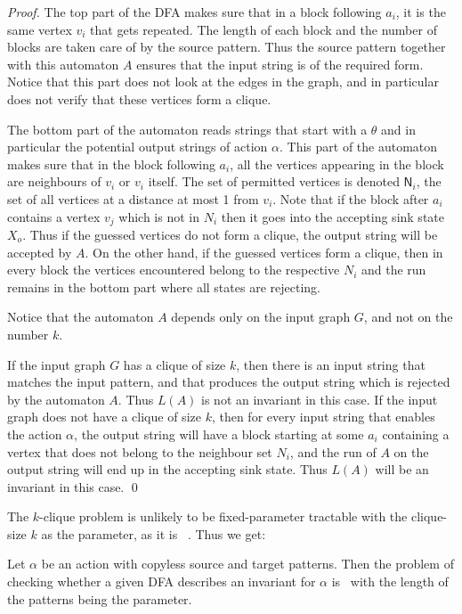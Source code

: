 \documentclass[12pt, a4paper]{article}
\newcommand{\action}{\alpha}
\begin{document}
\begin{proof}
The top part of the DFA makes sure that in a block following $a_i$, it is the same vertex $v_i$ that gets repeated. The length of each block and the number of blocks are taken care of by the source pattern. 
Thus the source pattern together with this automaton $A$ ensures that the input string is of the required form. Notice that this part does not look at the edges in the graph, and in particular does not verify that these vertices form a clique. 

The bottom part of the automaton reads strings that start with a $\theta$ and in particular the potential output strings of action $\action$. This part of the automaton makes sure that in the block following $a_i$, all the vertices appearing in the block are neighbours of $v_i$ or $v_i$ itself. The set of permitted vertices is denoted $\textsf{N}_i$, the set of all vertices at a distance at most 1 from $v_i$. Note that if the block after $a_i$ contains a vertex $v_j$ which is not in $N_i$ then it goes into the accepting sink state $X_o$.  Thus if the guessed vertices do not form a clique, the output string will be accepted by $A$. On the other hand, if the guessed vertices form a clique, then in every block the vertices encountered belong to the respective $N_i$ and the run remains in the bottom part where all states are rejecting. 

Notice that the automaton $A$ depends only on the input graph $G$, and not on the number $k$. 

If the input graph $G$ has a clique of size $k$, then there is an input string that matches the input pattern, and that produces the output string which is rejected by the automaton $A$. Thus $L(A)$ is not an invariant in this case. If the input graph does not have a clique of size $k$, then for every input string that enables the action $\action$, the output string will have a block starting at some $a_i$ containing a vertex that does not belong to the neighbour set $N_i$, and the run of $A$ on the output string will end up in the accepting sink state. Thus $L(A)$ will be an invariant in this case. \qed
\end{proof}

The $k$-clique problem is unlikely to be fixed-parameter tractable with the clique-size $k$ as the parameter, as it is \woneh\ \cite{DF1995}. Thus we get:

\begin{corollary}
Let $\alpha$ be an action with copyless source and target patterns. Then the problem of checking whether a given DFA describes an invariant for $\alpha$ is \woneh\ with the length of the patterns being the parameter.
\end{corollary}
\end{document}
